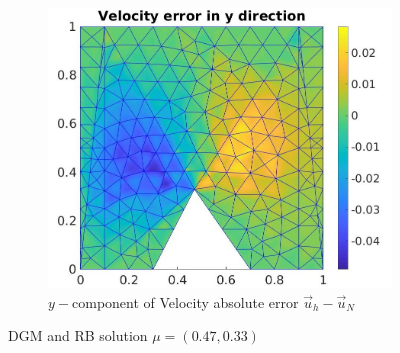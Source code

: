 \documentclass[graybox]{svmult}
\begin{document}
\begin{figure}[H]
\begin{subfigure}{0.31\textwidth}
\includegraphics[width=\linewidth]{velocity_error_2_at_47_33.jpg}
\caption{$y-$component of Velocity absolute error $\overrightarrow{u}_h-\overrightarrow{u}_N$} \label{error_y_vel}
\end{subfigure}

\caption{DGM and RB solution $\mu = (0.47,0.33)$} 
\label{dg_rb_solution_47_33}
\end{figure}
\end{document}
